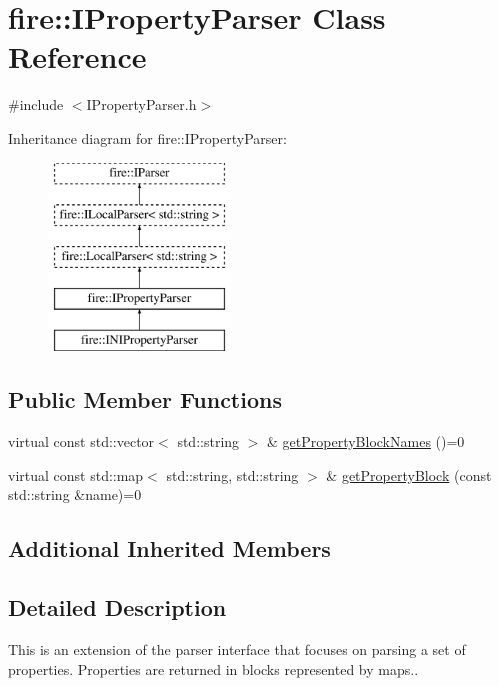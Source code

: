 \hypertarget{a00025}{}\section{fire\+:\+:I\+Property\+Parser Class Reference}
\label{a00025}


{\ttfamily \#include $<$I\+Property\+Parser.\+h$>$}

Inheritance diagram for fire\+:\+:I\+Property\+Parser\+:\begin{figure}[H]
\begin{center}
\leavevmode
\includegraphics[height=5.000000cm]{a00025}
\end{center}
\end{figure}
\subsection*{Public Member Functions}
\begin{DoxyCompactItemize}
\item 
virtual const std\+::vector$<$ std\+::string $>$ \& \hyperlink{a00025_a34602687f9d1affac7bd842102d4a6aa}{get\+Property\+Block\+Names} ()=0
\item 
virtual const std\+::map$<$ std\+::string, std\+::string $>$ \& \hyperlink{a00025_a34201371cb36dd09e96a66242ececb86}{get\+Property\+Block} (const std\+::string \&name)=0
\end{DoxyCompactItemize}
\subsection*{Additional Inherited Members}


\subsection{Detailed Description}
This is an extension of the parser interface that focuses on parsing a set of properties. Properties are returned in blocks represented by maps.. 

